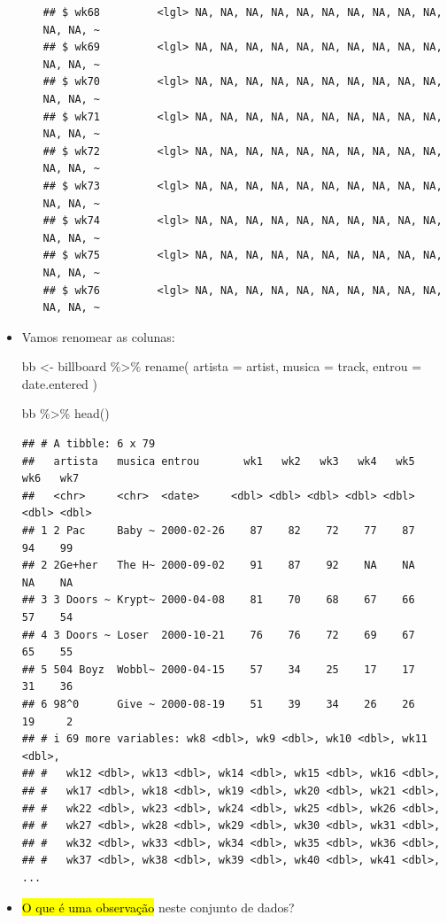 \documentclass[
  11pt]{report}
\newenvironment{Shaded}{\begin{snugshade}}{\end{snugshade}}
\newcommand{\AttributeTok}[1]{\textcolor[rgb]{0.77,0.63,0.00}{#1}}
\newcommand{\FunctionTok}[1]{\textcolor[rgb]{0.00,0.00,0.00}{#1}}
\newcommand{\NormalTok}[1]{#1}
\newcommand{\OtherTok}[1]{\textcolor[rgb]{0.56,0.35,0.01}{#1}}
\newcommand{\SpecialCharTok}[1]{\textcolor[rgb]{0.00,0.00,0.00}{#1}}
\renewenvironment{Shaded}{
    \begin{mdframed}[%
      roundcorner=2pt,%
      innerleftmargin=5pt,%
      innerrightmargin=5pt,%
      topline=true,%
      leftline=true,%
      rightline=true,%
      bottomline=true,%
      linewidth=0.5pt,%
      linecolor=black!20,%
      backgroundcolor=black!2,%
      skipabove=2ex,%
      skipbelow=2.5ex%
    ]%
  }
  {
    \end{mdframed}
  }
\begin{document}
\begin{itemize}
\begin{itemize}
\begin{verbatim}
## $ wk68         <lgl> NA, NA, NA, NA, NA, NA, NA, NA, NA, NA, NA, NA, ~
## $ wk69         <lgl> NA, NA, NA, NA, NA, NA, NA, NA, NA, NA, NA, NA, ~
## $ wk70         <lgl> NA, NA, NA, NA, NA, NA, NA, NA, NA, NA, NA, NA, ~
## $ wk71         <lgl> NA, NA, NA, NA, NA, NA, NA, NA, NA, NA, NA, NA, ~
## $ wk72         <lgl> NA, NA, NA, NA, NA, NA, NA, NA, NA, NA, NA, NA, ~
## $ wk73         <lgl> NA, NA, NA, NA, NA, NA, NA, NA, NA, NA, NA, NA, ~
## $ wk74         <lgl> NA, NA, NA, NA, NA, NA, NA, NA, NA, NA, NA, NA, ~
## $ wk75         <lgl> NA, NA, NA, NA, NA, NA, NA, NA, NA, NA, NA, NA, ~
## $ wk76         <lgl> NA, NA, NA, NA, NA, NA, NA, NA, NA, NA, NA, NA, ~
\end{verbatim}
  \end{itemize}
\item
  Vamos renomear as colunas:

\begin{Shaded}
\begin{Highlighting}[]
\NormalTok{bb }\OtherTok{\textless{}{-}}\NormalTok{ billboard }\SpecialCharTok{\%\textgreater{}\%} 
  \FunctionTok{rename}\NormalTok{(}
    \AttributeTok{artista =}\NormalTok{ artist,}
    \AttributeTok{musica =}\NormalTok{ track,}
    \AttributeTok{entrou =}\NormalTok{ date.entered}
\NormalTok{  )}
\end{Highlighting}
\end{Shaded}

\begin{Shaded}
\begin{Highlighting}[]
\NormalTok{bb }\SpecialCharTok{\%\textgreater{}\%} \FunctionTok{head}\NormalTok{()}
\end{Highlighting}
\end{Shaded}

\begin{verbatim}
## # A tibble: 6 x 79
##   artista   musica entrou       wk1   wk2   wk3   wk4   wk5   wk6   wk7
##   <chr>     <chr>  <date>     <dbl> <dbl> <dbl> <dbl> <dbl> <dbl> <dbl>
## 1 2 Pac     Baby ~ 2000-02-26    87    82    72    77    87    94    99
## 2 2Ge+her   The H~ 2000-09-02    91    87    92    NA    NA    NA    NA
## 3 3 Doors ~ Krypt~ 2000-04-08    81    70    68    67    66    57    54
## 4 3 Doors ~ Loser  2000-10-21    76    76    72    69    67    65    55
## 5 504 Boyz  Wobbl~ 2000-04-15    57    34    25    17    17    31    36
## 6 98^0      Give ~ 2000-08-19    51    39    34    26    26    19     2
## # i 69 more variables: wk8 <dbl>, wk9 <dbl>, wk10 <dbl>, wk11 <dbl>,
## #   wk12 <dbl>, wk13 <dbl>, wk14 <dbl>, wk15 <dbl>, wk16 <dbl>,
## #   wk17 <dbl>, wk18 <dbl>, wk19 <dbl>, wk20 <dbl>, wk21 <dbl>,
## #   wk22 <dbl>, wk23 <dbl>, wk24 <dbl>, wk25 <dbl>, wk26 <dbl>,
## #   wk27 <dbl>, wk28 <dbl>, wk29 <dbl>, wk30 <dbl>, wk31 <dbl>,
## #   wk32 <dbl>, wk33 <dbl>, wk34 <dbl>, wk35 <dbl>, wk36 <dbl>,
## #   wk37 <dbl>, wk38 <dbl>, wk39 <dbl>, wk40 <dbl>, wk41 <dbl>, ...
\end{verbatim}
\item
  {\hl{O que é uma observação}} neste conjunto de dados?


\end{itemize}
\end{document}
